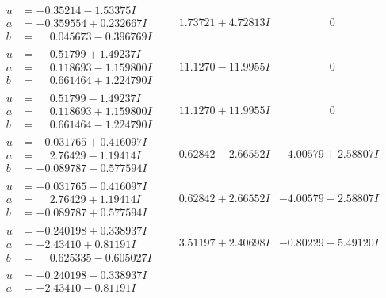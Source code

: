 \documentclass[1p]{elsarticle_modified}
\theoremstyle{definition}
\begin{document}
$$\begin{array}{c|c|c}
 \hline 
\begin{aligned}
u &= -0.35214 - 1.53375 I \\
a &= -0.359554 + 0.232667 I \\
b &= \phantom{-}0.045673 - 0.396769 I\end{aligned}
 & \phantom{-}1.73721 + 4.72813 I & \phantom{-0.000000 } 0 \\ \hline\begin{aligned}
u &= \phantom{-}0.51799 + 1.49237 I \\
a &= \phantom{-}0.118693 - 1.159800 I \\
b &= \phantom{-}0.661464 + 1.224790 I\end{aligned}
 & \phantom{-}11.1270 - 11.9955 I & \phantom{-0.000000 } 0 \\ \hline\begin{aligned}
u &= \phantom{-}0.51799 - 1.49237 I \\
a &= \phantom{-}0.118693 + 1.159800 I \\
b &= \phantom{-}0.661464 - 1.224790 I\end{aligned}
 & \phantom{-}11.1270 + 11.9955 I & \phantom{-0.000000 } 0 \\ \hline\begin{aligned}
u &= -0.031765 + 0.416097 I \\
a &= \phantom{-}2.76429 - 1.19414 I \\
b &= -0.089787 - 0.577594 I\end{aligned}
 & \phantom{-}0.62842 - 2.66552 I & -4.00579 + 2.58807 I \\ \hline\begin{aligned}
u &= -0.031765 - 0.416097 I \\
a &= \phantom{-}2.76429 + 1.19414 I \\
b &= -0.089787 + 0.577594 I\end{aligned}
 & \phantom{-}0.62842 + 2.66552 I & -4.00579 - 2.58807 I \\ \hline\begin{aligned}
u &= -0.240198 + 0.338937 I \\
a &= -2.43410 + 0.81191 I \\
b &= \phantom{-}0.625335 - 0.605027 I\end{aligned}
 & \phantom{-}3.51197 + 2.40698 I & -0.80229 - 5.49120 I \\ \hline\begin{aligned}
u &= -0.240198 - 0.338937 I \\
a &= -2.43410 - 0.81191 I \\

\end{aligned}
\end{array}$$
\end{document}
